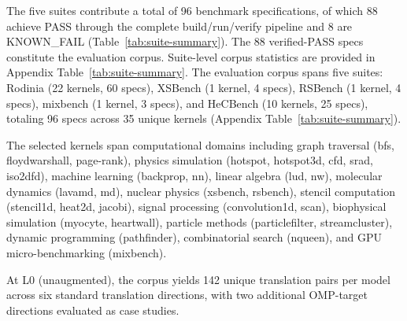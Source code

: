 \documentclass[conference]{IEEEtran}
\begin{document}
The five suites contribute a total of 96 benchmark specifications, of which 88 achieve PASS through the complete build/run/verify pipeline and 8 are KNOWN\_FAIL (Table~\ref{tab:suite-summary}). The 88 verified-PASS specs constitute the evaluation corpus.
Suite-level corpus statistics are provided in Appendix Table~\ref{tab:suite-summary}.
The evaluation corpus spans five suites: Rodinia (22 kernels, 60 specs),
XSBench (1 kernel, 4 specs), RSBench (1 kernel, 4 specs), mixbench
(1 kernel, 3 specs), and HeCBench (10 kernels, 25 specs), totaling
96 specs across 35 unique kernels
(Appendix Table~\ref{tab:suite-summary}).

The selected kernels span computational domains including graph traversal (bfs, floydwarshall, page-rank), physics simulation (hotspot, hotspot3d, cfd, srad, iso2dfd), machine learning (backprop, nn), linear algebra (lud, nw), molecular dynamics (lavamd, md), nuclear physics (xsbench, rsbench), stencil computation (stencil1d, heat2d, jacobi), signal processing (convolution1d, scan), biophysical simulation (myocyte, heartwall), particle methods (particlefilter, streamcluster), dynamic programming (pathfinder), combinatorial search (nqueen), and GPU micro-benchmarking (mixbench).

At L0 (unaugmented), the corpus yields 142 unique translation pairs per model across six standard translation directions, with two additional OMP-target directions evaluated as case studies.
\end{document}
